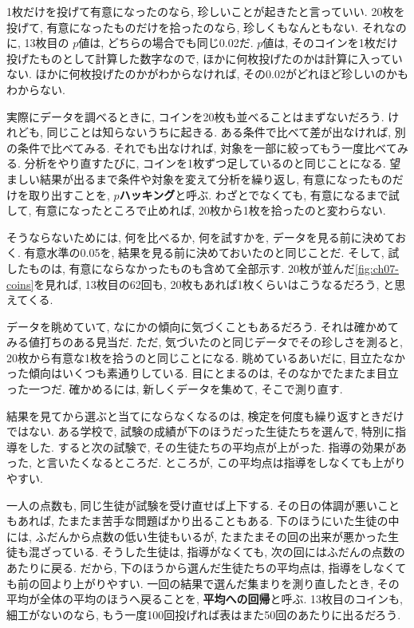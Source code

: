     1枚だけを投げて有意になったのなら, 珍しいことが起きたと言っていい.
    20枚を投げて, 有意になったものだけを拾ったのなら, 珍しくもなんともない.
    それなのに, 13枚目の $p$値は, どちらの場合でも同じ0.02だ.
    $p$値は, そのコインを1枚だけ投げたものとして計算した数字なので, ほかに何枚投げたのかは計算に入っていない.
    ほかに何枚投げたのかがわからなければ, その0.02がどれほど珍しいのかもわからない.

    実際にデータを調べるときに, コインを20枚も並べることはまずないだろう.
    けれども, 同じことは知らないうちに起きる.
    ある条件で比べて差が出なければ, 別の条件で比べてみる.
    それでも出なければ, 対象を一部に絞ってもう一度比べてみる.
    分析をやり直すたびに, コインを1枚ずつ足しているのと同じことになる.
    望ましい結果が出るまで条件や対象を変えて分析を繰り返し, 有意になったものだけを取り出すことを, \textbf{$p$ハッキング}と呼ぶ.
    わざとでなくても, 有意になるまで試して, 有意になったところで止めれば, 20枚から1枚を拾ったのと変わらない.

    そうならないためには, 何を比べるか, 何を試すかを, データを見る前に決めておく.
    有意水準の0.05を, 結果を見る前に決めておいたのと同じことだ.
    そして, 試したものは, 有意にならなかったものも含めて全部示す.
    20枚が並んだ\cref{fig:ch07-coins}を見れば, 13枚目の62回も, 20枚もあれば1枚くらいはこうなるだろう, と思えてくる.

    データを眺めていて, なにかの傾向に気づくこともあるだろう.
    それは確かめてみる値打ちのある見当だ.
    ただ, 気づいたのと同じデータでその珍しさを測ると, 20枚から有意な1枚を拾うのと同じことになる.
    眺めているあいだに, 目立たなかった傾向はいくつも素通りしている.
    目にとまるのは, そのなかでたまたま目立った一つだ.
    確かめるには, 新しくデータを集めて, そこで測り直す.

    結果を見てから選ぶと当てにならなくなるのは, 検定を何度も繰り返すときだけではない.
    ある学校で, 試験の成績が下のほうだった生徒たちを選んで, 特別に指導をした.
    すると次の試験で, その生徒たちの平均点が上がった.
    指導の効果があった, と言いたくなるところだ.
    ところが, この平均点は指導をしなくても上がりやすい.

    一人の点数も, 同じ生徒が試験を受け直せば上下する.
    その日の体調が悪いこともあれば, たまたま苦手な問題ばかり出ることもある.
    下のほうにいた生徒の中には, ふだんから点数の低い生徒もいるが, たまたまその回の出来が悪かった生徒も混ざっている.
    そうした生徒は, 指導がなくても, 次の回にはふだんの点数のあたりに戻る.
    だから, 下のほうから選んだ生徒たちの平均点は, 指導をしなくても前の回より上がりやすい.
    一回の結果で選んだ集まりを測り直したとき, その平均が全体の平均のほうへ戻ることを, \textbf{平均への回帰}と呼ぶ.
    13枚目のコインも, 細工がないのなら, もう一度100回投げれば表はまた50回のあたりに出るだろう.

